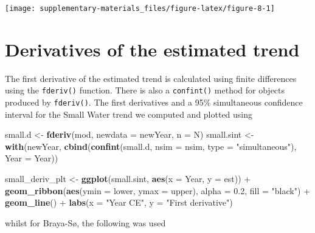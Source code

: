 \documentclass[12pt,]{article}
\newenvironment{Shaded}{\begin{snugshade}}{\end{snugshade}}
\newcommand{\KeywordTok}[1]{\textcolor[rgb]{0.13,0.29,0.53}{\textbf{{#1}}}}
\newcommand{\DataTypeTok}[1]{\textcolor[rgb]{0.13,0.29,0.53}{{#1}}}
\newcommand{\FloatTok}[1]{\textcolor[rgb]{0.00,0.00,0.81}{{#1}}}
\newcommand{\StringTok}[1]{\textcolor[rgb]{0.31,0.60,0.02}{{#1}}}
\newcommand{\NormalTok}[1]{{#1}}
\begin{document}
\begin{center}\texttt{[image: supplementary-materials\_files/figure-latex/figure-8-1]} \end{center}

\section{Derivatives of the estimated
trend}\label{derivatives-of-the-estimated-trend}

The first derivative of the estimated trend is calculated using finite
differences using the \texttt{fderiv()} function. There is also a
\texttt{confint()} method for objects produced by \texttt{fderiv()}. The
first derivatives and a 95\% simultaneous confidence interval for the
Small Water trend we computed and plotted using

\begin{Shaded}
\begin{Highlighting}[]
\NormalTok{small.d <-}\StringTok{ }\KeywordTok{fderiv}\NormalTok{(mod, }\DataTypeTok{newdata =} \NormalTok{newYear, }\DataTypeTok{n =} \NormalTok{N)}
\NormalTok{small.sint <-}\StringTok{ }\KeywordTok{with}\NormalTok{(newYear,}
                   \KeywordTok{cbind}\NormalTok{(}\KeywordTok{confint}\NormalTok{(small.d, }\DataTypeTok{nsim =} \NormalTok{nsim,}
                                 \DataTypeTok{type =} \StringTok{"simultaneous"}\NormalTok{),}
                         \DataTypeTok{Year =} \NormalTok{Year))}

\NormalTok{small_deriv_plt <-}\StringTok{ }\KeywordTok{ggplot}\NormalTok{(small.sint, }\KeywordTok{aes}\NormalTok{(}\DataTypeTok{x =} \NormalTok{Year, }\DataTypeTok{y =} \NormalTok{est)) +}
\StringTok{    }\KeywordTok{geom_ribbon}\NormalTok{(}\KeywordTok{aes}\NormalTok{(}\DataTypeTok{ymin =} \NormalTok{lower, }\DataTypeTok{ymax =} \NormalTok{upper), }\DataTypeTok{alpha =} \FloatTok{0.2}\NormalTok{,}
                \DataTypeTok{fill =} \StringTok{"black"}\NormalTok{) +}
\StringTok{    }\KeywordTok{geom_line}\NormalTok{() +}
\StringTok{    }\KeywordTok{labs}\NormalTok{(}\DataTypeTok{x =} \StringTok{"Year CE"}\NormalTok{, }\DataTypeTok{y =} \StringTok{"First derivative"}\NormalTok{)}
\end{Highlighting}
\end{Shaded}

whilst for Braya-Sø, the following was used
\end{document}
